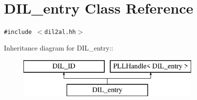\section{DIL\_\-entry  Class Reference}
\label{classDIL__entry}
{\tt \#include $<$dil2al.hh$>$}

Inheritance diagram for DIL\_\-entry::\begin{figure}[H]
\begin{center}
\leavevmode
\includegraphics[height=2cm]{classDIL__entry}
\end{center}
\end{figure}
